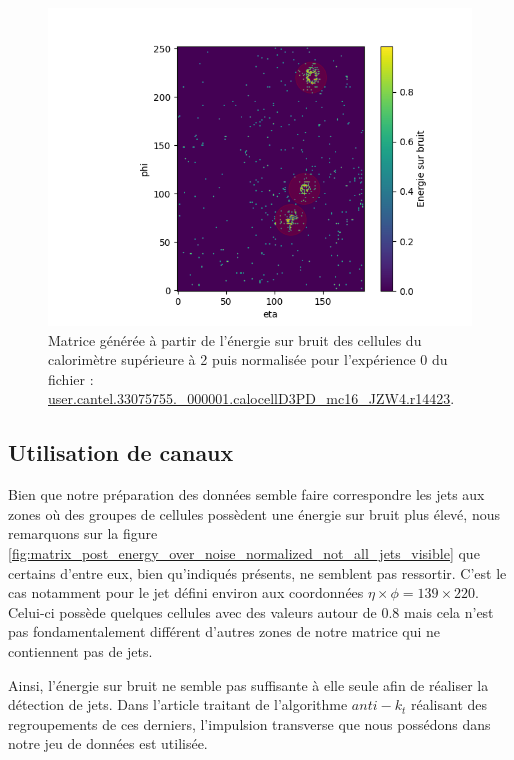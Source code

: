 \begin{figure}[hbt!]
    \centering
    \includegraphics[scale=0.7]{Figures/dataset/matrix_post_energy_over_noise_normalized.png}
    \caption{Matrice générée à partir de l'énergie sur bruit des cellules du calorimètre supérieure à 2 puis normalisée pour l'expérience 0 du fichier : \url{user.cantel.33075755.\_000001.calocellD3PD\_mc16\_JZW4.r14423}.}
    \label{fig:matrix_post_energy_over_noise_normalized}
\end{figure}

\break

\subsection{Utilisation de canaux}

Bien que notre préparation des données semble faire correspondre les jets aux zones où des groupes de cellules possèdent une énergie sur bruit plus élevé, nous remarquons sur la figure \ref{fig:matrix_post_energy_over_noise_normalized_not_all_jets_visible} que certains d'entre eux, bien qu'indiqués présents, ne semblent pas ressortir. C'est le cas notamment pour le jet défini environ aux coordonnées $\eta \times \phi = 139 \times 220$. Celui-ci possède quelques cellules avec des valeurs autour de $0.8$ mais cela n'est pas fondamentalement différent d'autres zones de notre matrice qui ne contiennent pas de jets.

Ainsi, l'énergie sur bruit ne semble pas suffisante à elle seule afin de réaliser la détection de jets. Dans l'article traitant de l'algorithme $anti-k_t$ \cite{cacciari_anti-k_t_2008} réalisant des regroupements de ces derniers, l'impulsion transverse que nous possédons dans notre jeu de données est utilisée.

